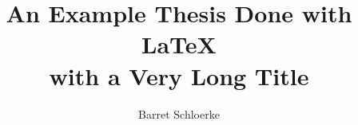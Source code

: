 \documentclass[ece,dissertation]{puthesis}
\title{An Example Thesis Done with LaTeX\\
  with a Very Long Title}
\author{Barret Schloerke}{Schloerke, Barret}
\begin{document}
\volume












\appendices









\end{document}
